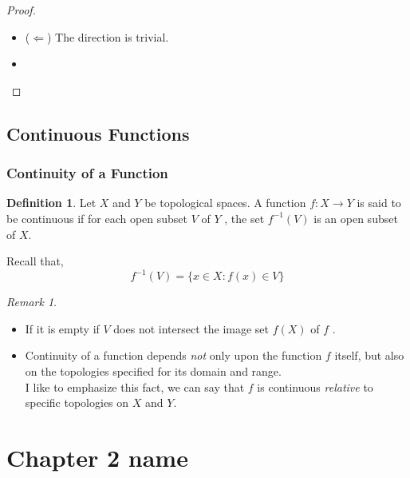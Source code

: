 \documentclass[
]{book}
\providecommand{\tightlist}{%
  \setlength{\itemsep}{0pt}\setlength{\parskip}{0pt}}
\theoremstyle{definition}
\newtheorem{definition}{Definition}[chapter]
\theoremstyle{definition}
\theoremstyle{definition}
\theoremstyle{definition}
\theoremstyle{remark}
\newtheorem*{remark}{Remark}
\begin{document}
\begin{proof}
\leavevmode

\begin{itemize}
\tightlist
\item
  (\(\Longleftarrow\)) The direction is trivial.
\item
\end{itemize}

\end{proof}

\hypertarget{continuous-functions}{%
\section{Continuous Functions}\label{continuous-functions}}

\hypertarget{continuity-of-a-function}{%
\subsection{Continuity of a Function}\label{continuity-of-a-function}}

\begin{definition}
\protect\hypertarget{def:unnamed-chunk-88}{}\label{def:unnamed-chunk-88}Let \(X\) and \(Y\) be topological spaces. A function \(f : X \to Y\) is said to be continuous if for each open subset \(V\) of \(Y\) , the set \(f^{−1}(V)\) is an open subset of \(X\).
\end{definition}

Recall that,
\[f^{ −1}(V)=\{x\in X: f(x)\in V\}\]

\begin{remark}
\leavevmode

\begin{itemize}
\tightlist
\item
  If it is empty if \(V\) does not intersect the image set \(f (X)\) of \(f\) .
\item
  Continuity of a function depends \emph{not} only upon the function \(f\) itself, but also on the topologies specified for its domain and range.\\
  I like to emphasize this fact, we can say that \(f\) is continuous \emph{relative} to specific topologies on \(X\) and \(Y\).
\end{itemize}

\end{remark}

\hypertarget{chapter-2-name}{%
\chapter{Chapter 2 name}\label{chapter-2-name}}
\end{document}
